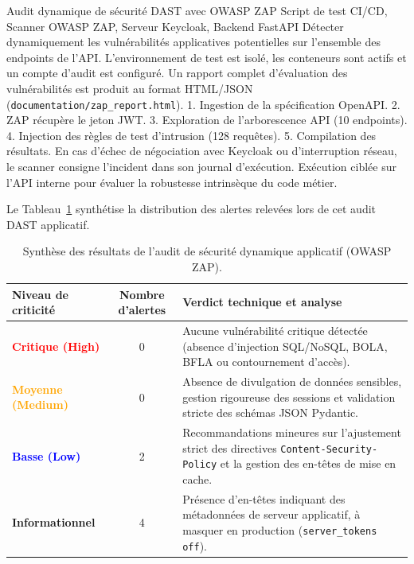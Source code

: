 \scenariotable
{Audit dynamique de sécurité DAST avec OWASP ZAP}
{Script de test CI/CD, Scanner OWASP ZAP, Serveur Keycloak, Backend FastAPI}
{Détecter dynamiquement les vulnérabilités applicatives potentielles sur l'ensemble des endpoints de l'API.}
{L'environnement de test est isolé, les conteneurs sont actifs et un compte d'audit est configuré.}
{Un rapport complet d'évaluation des vulnérabilités est produit au format HTML/JSON (\texttt{documentation/zap\_report.html}).}
{1. Ingestion de la spécification OpenAPI. 2. ZAP récupère le jeton JWT. 3. Exploration de l'arborescence API (10 endpoints). 4. Injection des règles de test d'intrusion (128 requêtes). 5. Compilation des résultats.}
{En cas d'échec de négociation avec Keycloak ou d'interruption réseau, le scanner consigne l'incident dans son journal d'exécution.}
{Exécution ciblée sur l'API interne pour évaluer la robustesse intrinsèque du code métier.}

Le Tableau~\ref{tab:zap_results} synthétise la distribution des alertes relevées lors de cet audit DAST applicatif.

\begin{table}[!htbp]
    \centering
    \begin{tabular}{|l|c|p{7.5cm}|}
        \hline
        \textbf{Niveau de criticité} & \textbf{Nombre d'alertes} & \textbf{Verdict technique et analyse} \\ \hline
        \textcolor{red}{\textbf{Critique (High)}} & 0 & Aucune vulnérabilité critique détectée (absence d'injection SQL/NoSQL, BOLA, BFLA ou contournement d'accès). \\ \hline
        \textcolor{orange}{\textbf{Moyenne (Medium)}} & 0 & Absence de divulgation de données sensibles, gestion rigoureuse des sessions et validation stricte des schémas JSON Pydantic. \\ \hline
        \textcolor{blue}{\textbf{Basse (Low)}} & 2 & Recommandations mineures sur l'ajustement strict des directives \texttt{Content-Security-Policy} et la gestion des en-têtes de mise en cache. \\ \hline
        \textbf{Informationnel} & 4 & Présence d'en-têtes indiquant des métadonnées de serveur applicatif, à masquer en production (\texttt{server\_tokens off}). \\ \hline
    \end{tabular}
    \caption{Synthèse des résultats de l'audit de sécurité dynamique applicatif (OWASP ZAP).}
    \label{tab:zap_results}
\end{table}

